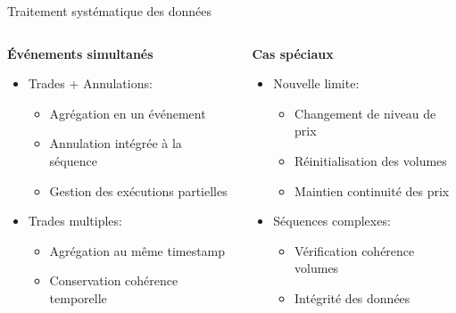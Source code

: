\documentclass[aspectratio=169]{beamer}  %
\begin{document}
\begin{frame}{Traitement systématique des données}
    \begin{columns}
        \begin{column}{0.5\textwidth}
            \textbf{Événements simultanés}
            \begin{itemize}
                \item \small{Trades + Annulations:}
                \begin{itemize}
                    \item \footnotesize{Agrégation en un événement}
                    \item \footnotesize{Annulation intégrée à la séquence}
                    \item \footnotesize{Gestion des exécutions partielles}
                \end{itemize}
                \item \small{Trades multiples:}
                \begin{itemize}
                    \item \footnotesize{Agrégation au même timestamp}
                    \item \footnotesize{Conservation cohérence temporelle}
                \end{itemize}
            \end{itemize}
        \end{column}
        \begin{column}{0.5\textwidth}
            \textbf{Cas spéciaux}
            \begin{itemize}
                \item \small{Nouvelle limite:}
                \begin{itemize}
                    \item \footnotesize{Changement de niveau de prix}
                    \item \footnotesize{Réinitialisation des volumes}
                    \item \footnotesize{Maintien continuité des prix}
                \end{itemize}
                \item \small{Séquences complexes:}
                \begin{itemize}
                    \item \footnotesize{Vérification cohérence volumes}
                    \item \footnotesize{Intégrité des données}

\end{itemize}
\end{itemize}
\end{column}
\end{columns}
\end{frame}
\end{document}
